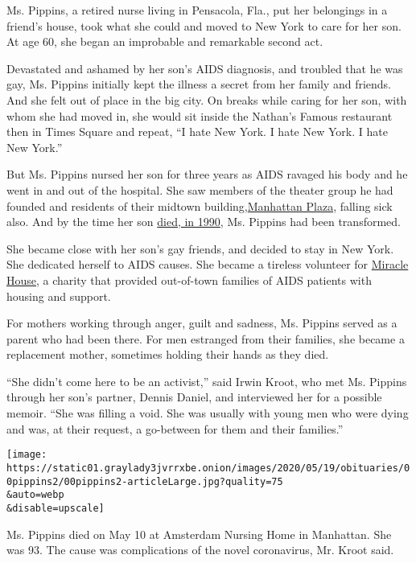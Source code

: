 Ms. Pippins, a retired nurse living in Pensacola, Fla., put her
belongings in a friend's house, took what she could and moved to New
York to care for her son. At age 60, she began an improbable and
remarkable second act.

Devastated and ashamed by her son's AIDS diagnosis, and troubled that he
was gay, Ms. Pippins initially kept the illness a secret from her family
and friends. And she felt out of place in the big city. On breaks while
caring for her son, with whom she had moved in, she would sit inside the
Nathan's Famous restaurant then in Times Square and repeat, ``I hate New
York. I hate New York. I hate New York.''

But Ms. Pippins nursed her son for three years as AIDS ravaged his body
and he went in and out of the hospital. She saw members of the theater
group he had founded and residents of their midtown
building,\href{https://www.nytimes3xbfgragh.onion/1989/09/08/nyregion/on-the-block-where-aids-hits-hardest-residents-rally.html}{Manhattan
Plaza}, falling sick also. And by the time her son
\href{https://www.nytimes3xbfgragh.onion/1990/07/29/obituaries/nick-pippin-35-dies-founded-aids-group.html}{died,
in 1990}, Ms. Pippins had been transformed.

She became close with her son's gay friends, and decided to stay in New
York. She dedicated herself to AIDS causes. She became a tireless
volunteer for
\href{https://www.edgemedianetwork.com/news/local/162240}{Miracle
House}, a charity that provided out-of-town families of AIDS patients
with housing and support.

For mothers working through anger, guilt and sadness, Ms. Pippins served
as a parent who had been there. For men estranged from their families,
she became a replacement mother, sometimes holding their hands as they
died.

``She didn't come here to be an activist,'' said Irwin Kroot, who met
Ms. Pippins through her son's partner, Dennis Daniel, and interviewed
her for a possible memoir. ``She was filling a void. She was usually
with young men who were dying and was, at their request, a go-between
for them and their families.''

\texttt{[image: https://static01.graylady3jvrrxbe.onion/images/2020/05/19/obituaries/00pippins2/00pippins2-articleLarge.jpg?quality=75\\\&auto=webp\\\&disable=upscale]}

Ms. Pippins died on May 10 at Amsterdam Nursing Home in Manhattan. She
was 93. The cause was complications of the novel coronavirus, Mr. Kroot
said.

